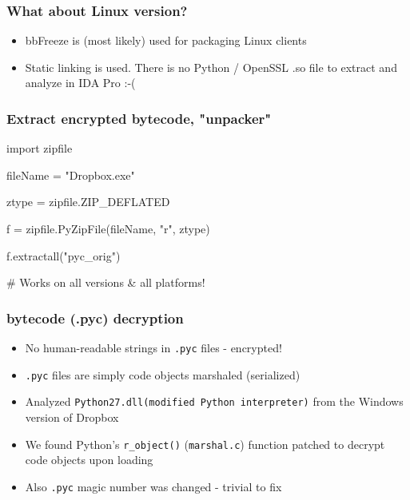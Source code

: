 \documentclass{beamer}
\newcommand\myfont{\fontsize{14}{20}\selectfont}
\begin{document}
\begin{frame}
\frametitle{What about Linux version?}
\myfont
\begin{itemize}
\itemsep 2em
\item bbFreeze is (most likely) used for packaging Linux clients

\item Static linking is used. There is no Python / OpenSSL .so file to extract
and analyze in IDA Pro :-(

\end{itemize}
\end{frame}

\begin{frame}[fragile]
\frametitle{Extract encrypted bytecode, "unpacker"}
\begin{python}
import zipfile

fileName = "Dropbox.exe"

ztype = zipfile.ZIP_DEFLATED

f = zipfile.PyZipFile(fileName, "r", ztype)

f.extractall("pyc_orig")

# Works on all versions & all platforms!
\end{python}
\end{frame}


\begin{frame}
	\frametitle{bytecode (.pyc) decryption}
\begin{itemize}
\itemsep 2em
\item{No human-readable strings in \texttt{.pyc} files - encrypted!}
\item{\texttt{.pyc} files are simply code objects marshaled (serialized)}
\item{Analyzed \texttt{Python27.dll(modified Python interpreter)} from the Windows version of Dropbox}
\item{We found Python's \texttt{r\_object()} (\texttt{marshal.c}) function
patched to decrypt code objects upon loading}
\item{Also \texttt{.pyc} magic number was changed - trivial to fix}
\end{itemize}
\end{frame}
\end{document}
